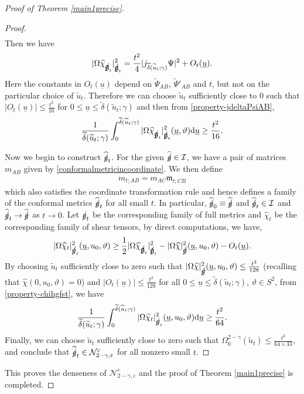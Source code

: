 \documentclass[11pt,reqno]{amsart}
\theoremstyle{definition}
\numberwithin{equation}{section}
\newcommand{\D}{\mathrm{d}}
\def\chih{\widehat{\chi}}
\def\ub{\underline{u}}
\newcommand{\tdelta}{\widetilde{\delta}}
\newcommand{\tu}{\widetilde{u}}
\def\gs{\mbox{$g \mkern -9mu /$}}
\def\gfs{\mbox{$\mathfrak{g} \mkern -9mu /$}}
\begin{document}
\begin{proof}[Proof of Theorem \ref{main1precise}]
\begin{proof}
\begin{align*}
\end{align*}
Then we have
\begin{align*}
|\Omega\chih_{\gfs_t}|^2_{\gfs_t}=\frac{t^2}{4}|j_{\tdelta(\tu_t;\gamma)}\Psi|^2+O_t(\ub).
\end{align*}
Here the constants in $O_t(\ub)$ depend on $\widetilde{\Psi}_{AB}$, $\widetilde{\Psi}'_{AB}$ and $t$, but not on the particular choice of $\tu_t$. Therefore we can choose $\tu_t$ sufficiently close to $0$ such that $|O_t(\ub)|\le\frac{t^2}{16}$ for $0\le\ub\le\tdelta(\tu_t;\gamma)$ and then from \eqref{property-jdeltaPsiAB},
\begin{align}\label{property-chihgfst}
\frac{1}{\tdelta(\tu_t;\gamma)}\int_0^{\tdelta(\tu_t;\gamma)}|\Omega\chih_{\gfs_t}|^2_{\gfs_t}(\ub,\vartheta)\D\ub\ge\frac{t^2}{16}.
\end{align}

Now we begin to construct $\widehat{\gs}_t$. For the given $\widehat{\gs}\in\mathcal{I}$, we have a pair of matrices $m_{AB}$ given by \eqref{conformalmetricincoordinate}. We then define 
\begin{align}\label{def-ghatt-cutoff}
m_{t;AB}=m_{AC}\mathfrak{m}_{t;CB}
\end{align}
which also satisfies the coordinate transformation rule and hence defines a family of the conformal metrics $\widehat{\gs}_t$ for all small $t$. In particular, $\widehat{\gs}_0\equiv\widehat{\gs}$ and $\widehat{\gs}_t\in\mathcal{I}$ and $\widehat{\gs}_t\to \widehat{\gs}$ as $t\to0$. Let $\gs_t$ be the corresponding family of full metrics and $\chih_t$ be the corresponding family of shear tensors, by direct computations, we have, 
\begin{align*}
|\Omega\chih_t|_{{\gs}_t}^2(\ub,u_0,\vartheta)\ge\frac{1}{2}|\Omega\chih_{\gfs_t}|^2_{\gfs_t}-|\Omega\chih|_{\gs}^2(\ub,u_0,\vartheta)-O_t(\ub).
\end{align*}
By choosing $\tu_t$ sufficiently close to zero such that $|\Omega\chih|^2_{\gs}(\ub,u_0,\vartheta)\le\frac{t^2}{128}$ (recalling that $\chih(0,u_0,\vartheta)=0$) and $|O_t(\ub)|\le\frac{t^2}{128}$ for all $0\le\ub\le\tdelta(\tu_t;\gamma)$, $\vartheta\in S^2$, from \eqref{property-chihgfst}, we have
\begin{align}\label{property-chiht}
\frac{1}{\tdelta(\tu_t;\gamma)}\int_0^{\tdelta(\tu_t;\gamma)}|\Omega\chih_t|^2_{\gs_t}(\ub,u_0,\vartheta)\D\ub\ge\frac{t^2}{64}.
\end{align}
Finally, we can choose $\tu_t$ sufficiently close to zero such that $\Omega_0^{2-\gamma}(\tu_t)\le\frac{t^2}{64\times 33}$, and conclude that $\widehat{\gs}_t\in\mathcal{N}^c_{2-\gamma,\varepsilon}$ for all nonzero small $t$.

\end{proof}
This proves the denseness of $\mathcal{N}^c_{2-\gamma,\varepsilon}$ and the proof of Theorem \ref{main1precise} is completed.

\end{proof}
\end{document}
